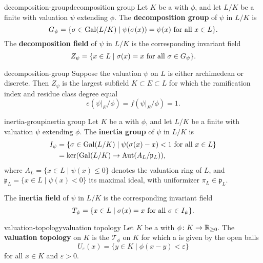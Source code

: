 \begin{topic}{decomposition-group}{decomposition group}
    Let $K$ be a  with  $\phi$, and let $L/K$ be a finite  with valuation $\psi$ extending $\phi$. The \textbf{decomposition group} of $\psi$ in $L/K$ is
    \[ G_\psi = \{ \sigma \in \operatorname{Gal}(L/K) \mid \psi(\sigma(x)) = \psi(x) \textup{ for all } x \in L \} . \]
    The \textbf{decomposition field} of $\psi$ in $L/K$ is the corresponding invariant field
    \[ Z_\psi = \{ x \in L \mid \sigma(x) = x \textup{ for all } \sigma \in G_\psi \} . \]
\end{topic}

\begin{example}{decomposition-group}
    Suppose the valuation $\psi$ on $L$ is either archimedean or discrete. Then $Z_\psi$ is the largest subfield $K \subset E \subset L$ for which the ramification index and residue class degree equal
    \[ e(\psi|_E / \phi) = f(\psi|_E / \phi) = 1 . \]
\end{example}

\begin{topic}{inertia-group}{inertia group}
    Let $K$ be a  with  $\phi$, and let $L/K$ be a finite  with valuation $\psi$ extending $\phi$. The \textbf{inertia group} of $\psi$ in $L/K$ is
    \[ \begin{aligned}
        I_\psi &= \{ \sigma \in \operatorname{Gal}(L/K) \mid \psi(\sigma(x) - x) < 1 \textup{ for all } x \in L \} \\
        &= \ker (\operatorname{Gal}(L/K) \to \operatorname{Aut}(A_L / \mathfrak{p}_L)) ,
    \end{aligned} \]
    where $A_L = \{ x \in L \mid \psi(x) \le 0 \}$ denotes the valuation ring of $L$, and $\mathfrak{p}_L = \{ x \in L \mid \psi(x) < 0 \}$ its maximal ideal, with uniformizer $\pi_L \in \mathfrak{p}_L$.
    
    The \textbf{inertia field} of $\psi$ in $L/K$ is the corresponding invariant field
    \[ T_\psi = \{ x \in L \mid \sigma(x) = x \textup{ for all } \sigma \in I_\psi \} . \]
\end{topic}

\begin{topic}{valuation-topology}{valuation topology}
    Let $K$ be a  with  $\phi \colon K \to \mathbb{R}_{\ge 0}$. The \textbf{valuation topology} on $K$ is the  $\mathcal{T}_\phi$ on $K$ for which a  is given by the open balls
    \[ U_\varepsilon(x) = \{ y \in K \mid \phi(x - y) < \varepsilon \} \]
    for all $x \in K$ and $\varepsilon > 0$.
\end{topic}

